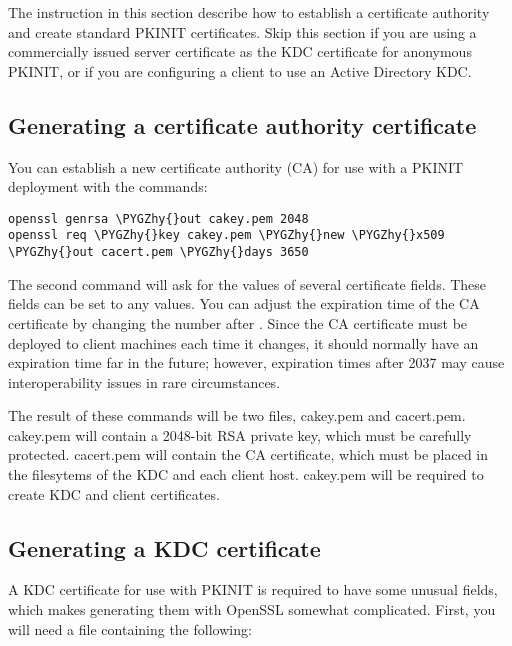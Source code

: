 \documentclass[letterpaper,10pt,english]{sphinxmanual}
\def\PYGZhy{\char`\-}
\begin{document}
The instruction in this section describe how to establish a
certificate authority and create standard PKINIT certificates.  Skip
this section if you are using a commercially issued server certificate
as the KDC certificate for anonymous PKINIT, or if you are configuring
a client to use an Active Directory KDC.


\subsection{Generating a certificate authority certificate}
\label{admin/pkinit:generating-a-certificate-authority-certificate}
You can establish a new certificate authority (CA) for use with a
PKINIT deployment with the commands:

\begin{Verbatim}[commandchars=\\\{\}]
openssl genrsa \PYGZhy{}out cakey.pem 2048
openssl req \PYGZhy{}key cakey.pem \PYGZhy{}new \PYGZhy{}x509 \PYGZhy{}out cacert.pem \PYGZhy{}days 3650
\end{Verbatim}

The second command will ask for the values of several certificate
fields.  These fields can be set to any values.  You can adjust the
expiration time of the CA certificate by changing the number after
.  Since the CA certificate must be deployed to client
machines each time it changes, it should normally have an expiration
time far in the future; however, expiration times after 2037 may cause
interoperability issues in rare circumstances.

The result of these commands will be two files, cakey.pem and
cacert.pem.  cakey.pem will contain a 2048-bit RSA private key, which
must be carefully protected.  cacert.pem will contain the CA
certificate, which must be placed in the filesytems of the KDC and
each client host.  cakey.pem will be required to create KDC and client
certificates.


\subsection{Generating a KDC certificate}
\label{admin/pkinit:generating-a-kdc-certificate}
A KDC certificate for use with PKINIT is required to have some unusual
fields, which makes generating them with OpenSSL somewhat complicated.
First, you will need a file containing the following:
\end{document}
